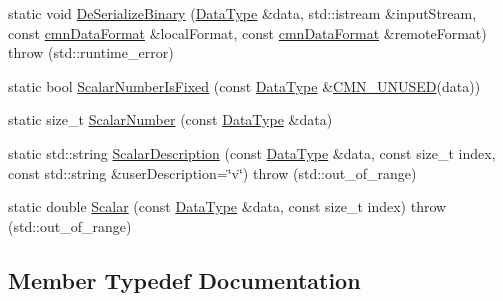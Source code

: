 \begin{DoxyCompactItemize}
\item 
static void \hyperlink{classcmn_data_3_01std_1_1vector_3_01__element_type_01_4_01_4_a36ff053a8e35de00cb0e0183d2f81673}{De\+Serialize\+Binary} (\hyperlink{classcmn_data_3_01std_1_1vector_3_01__element_type_01_4_01_4_a7a5332ebd12138b5f6d8b856cd3fdfd5}{Data\+Type} \&data, std\+::istream \&input\+Stream, const \hyperlink{classcmn_data_format}{cmn\+Data\+Format} \&local\+Format, const \hyperlink{classcmn_data_format}{cmn\+Data\+Format} \&remote\+Format)  throw (std\+::runtime\+\_\+error)
\item 
static bool \hyperlink{classcmn_data_3_01std_1_1vector_3_01__element_type_01_4_01_4_af3d6e0d0f3cffd877e9da2cc5ed45962}{Scalar\+Number\+Is\+Fixed} (const \hyperlink{classcmn_data_3_01std_1_1vector_3_01__element_type_01_4_01_4_a7a5332ebd12138b5f6d8b856cd3fdfd5}{Data\+Type} \&\hyperlink{cmn_portability_8h_a021894e2626935fa2305434b1e893ff6}{C\+M\+N\+\_\+\+U\+N\+U\+S\+E\+D}(data))
\item 
static size\+\_\+t \hyperlink{classcmn_data_3_01std_1_1vector_3_01__element_type_01_4_01_4_a9ec6f3db4445118901e9cdf2c09a510e}{Scalar\+Number} (const \hyperlink{classcmn_data_3_01std_1_1vector_3_01__element_type_01_4_01_4_a7a5332ebd12138b5f6d8b856cd3fdfd5}{Data\+Type} \&data)
\item 
static std\+::string \hyperlink{classcmn_data_3_01std_1_1vector_3_01__element_type_01_4_01_4_a7840fb40b18cd8c6427d889b03627aa2}{Scalar\+Description} (const \hyperlink{classcmn_data_3_01std_1_1vector_3_01__element_type_01_4_01_4_a7a5332ebd12138b5f6d8b856cd3fdfd5}{Data\+Type} \&data, const size\+\_\+t index, const std\+::string \&user\+Description=\char`\"{}v\char`\"{})  throw (std\+::out\+\_\+of\+\_\+range)
\item 
static double \hyperlink{classcmn_data_3_01std_1_1vector_3_01__element_type_01_4_01_4_aa83fd0fb588a1c79a88a4e94e143241b}{Scalar} (const \hyperlink{classcmn_data_3_01std_1_1vector_3_01__element_type_01_4_01_4_a7a5332ebd12138b5f6d8b856cd3fdfd5}{Data\+Type} \&data, const size\+\_\+t index)  throw (std\+::out\+\_\+of\+\_\+range)
\end{DoxyCompactItemize}


\subsection{Member Typedef Documentation}
\hypertarget{classcmn_data_3_01std_1_1vector_3_01__element_type_01_4_01_4_a7a5332ebd12138b5f6d8b856cd3fdfd5}{}
